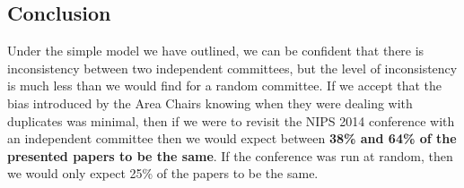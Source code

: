 \begin{Shaded}
\begin{Highlighting}[]
\NormalTok{ [}\NormalTok{, }\NormalTok{, }\NormalTok{]:}
\OperatorTok{=}\NormalTok{ []}
     \NormalTok{(}\NormalTok{):}
\OperatorTok{=}
\OperatorTok{+}\NormalTok{joindf.loc[ind][}\NormalTok{])))}
\OperatorTok{=}
\OperatorTok{=}
\OperatorTok{=} \OperatorTok{*}
    \NormalTok{(}\OperatorTok{=}\NormalTok{, }\NormalTok{)))}
    \NormalTok{(}\StringTok{ +/{-} }\OperatorTok{=}\OperatorTok{=}
\end{Highlighting}
\end{Shaded}

\hypertarget{conclusion}{%
\subsection{Conclusion}\label{conclusion}}

\begin{flushright}
\end{flushright}

Under the simple model we have outlined, we can be confident that there
is inconsistency between two independent committees, but the level of
inconsistency is much less than we would find for a random committee. If
we accept that the bias introduced by the Area Chairs knowing when they
were dealing with duplicates was minimal, then if we were to revisit the
NIPS 2014 conference with an independent committee then we would expect
between \textbf{38\% and 64\% of the presented papers to be the same}.
If the conference was run at random, then we would only expect 25\% of
the papers to be the same.

